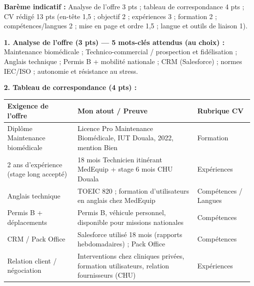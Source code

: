 \documentclass[11pt]{article}
\begin{document}
\begin{corrige}
\textbf{Barème indicatif :} Analyse de l'offre 3 pts ; tableau de correspondance 4 pts ; CV rédigé 13 pts (en-tête 1,5 ; objectif 2 ; expériences 3 ; formation 2 ; compétences/langues 2 ; mise en page et ordre 1,5 ; langue et outils de liaison 1).

\textbf{1. Analyse de l'offre (3 pts) — 5 mots-clés attendus (au choix) :} Maintenance biomédicale ; Technico-commercial / prospection et fidélisation ; Anglais technique ; Permis B + mobilité nationale ; CRM (Salesforce) ; normes IEC/ISO ; autonomie et résistance au stress.

\textbf{2. Tableau de correspondance (4 pts) :}
\begin{center}
\begin{tabularx}{\linewidth}{|l|X|l|}\hline
\rowcolor{popblueL} \textbf{Exigence de l'offre} & \textbf{Mon atout / Preuve} & \textbf{Rubrique CV} \\ \hline
Diplôme Maintenance biomédicale & Licence Pro Maintenance Biomédicale, IUT Douala, 2022, mention Bien & Formation \\ \hline
2 ans d'expérience (stage long accepté) & 18 mois Technicien itinérant MedEquip + stage 6 mois CHU Douala & Expériences \\ \hline
Anglais technique & TOEIC 820 ; formation d'utilisateurs en anglais chez MedEquip & Compétences / Langues \\ \hline
Permis B + déplacements & Permis B, véhicule personnel, disponible pour missions nationales & Compétences \\ \hline
CRM / Pack Office & Salesforce utilisé 18 mois (rapports hebdomadaires) ; Pack Office & Compétences \\ \hline
Relation client / négociation & Interventions chez cliniques privées, formation utilisateurs, relation fournisseurs (CHU) & Expériences \\ \hline
\end{tabularx}
\end{center}


\end{corrige}
\end{document}
